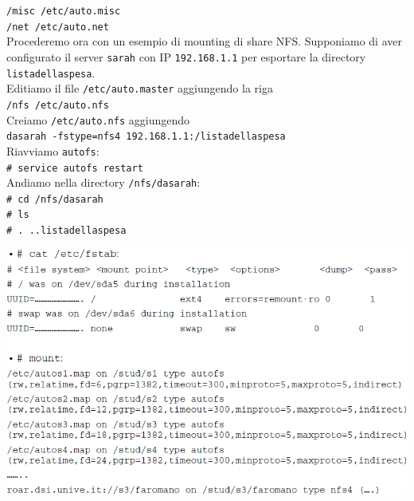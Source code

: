 \documentclass[a4paper]{report}
\newcommand\tab[1][1cm]{\hspace*{#1}}
\begin{document}
\tab\texttt{/misc /etc/auto.misc}\\
\tab\texttt{/net /etc/auto.net}\\ 
Procederemo ora con un esempio di mounting di share NFS. Supponiamo di aver configurato il server \texttt{sarah} con IP \texttt{192.168.1.1} per esportare la directory \texttt{listadellaspesa}.\\
Editiamo il file \texttt{/etc/auto.master} aggiungendo la riga\\
\tab\texttt{/nfs \tab /etc/auto.nfs}\\
Creiamo \texttt{/etc/auto.nfs} aggiungendo\\
\tab\texttt{dasarah \tab -fstype=nfs4 192.168.1.1:/listadellaspesa}\\
Riavviamo \texttt{autofs}:\\
\tab\texttt{\# service autofs restart}\\
Andiamo nella directory \texttt{/nfs/dasarah}:\\
\tab\texttt{\# cd /nfs/dasarah}\\
\tab\texttt{\# ls}\\
\tab\texttt{\# . ..listadellaspesa}\\
\begin{center}
\includegraphics[scale=0.6]{autofslab.png}
\end{center}
\end{document}
